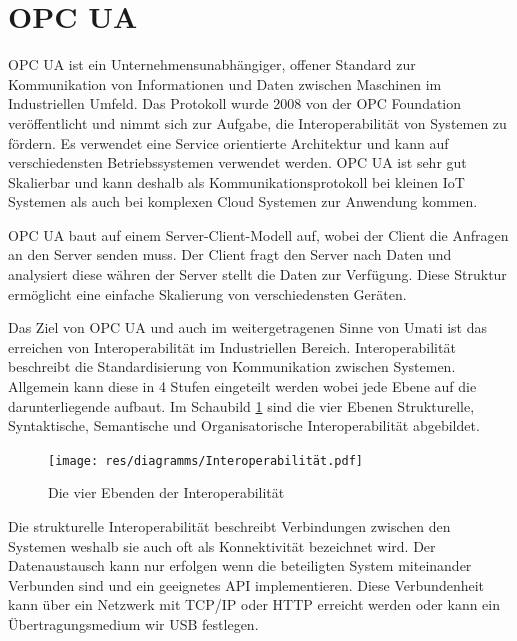 \documentclass[a4paper, 12pt, oneside]{scrbook}
\begin{document}
	
	
	\section{OPC UA}
	
	
	
	 \ac{OPC UA} ist ein Unternehmensunabhängiger, offener Standard zur Kommunikation von Informationen und Daten zwischen Maschinen im Industriellen Umfeld. Das Protokoll wurde 2008 von der OPC Foundation veröffentlicht und nimmt sich zur Aufgabe, die Interoperabilität von Systemen zu fördern. Es verwendet eine Service orientierte Architektur und kann auf verschiedensten Betriebssystemen verwendet werden. OPC UA ist sehr gut Skalierbar und kann deshalb als Kommunikationsprotokoll bei kleinen \ac{IoT} Systemen als auch bei komplexen Cloud Systemen zur Anwendung kommen.
	
	 OPC UA baut auf einem Server-Client-Modell auf, wobei der Client die Anfragen an den Server senden muss. Der Client fragt den Server nach Daten und analysiert diese währen der Server stellt die Daten zur Verfügung. Diese Struktur ermöglicht eine einfache Skalierung von verschiedensten Geräten. 
	
	
	
	 Das Ziel von OPC UA und auch im weitergetragenen Sinne von Umati ist das erreichen von Interoperabilität im Industriellen Bereich. Interoperabilität beschreibt die Standardisierung von Kommunikation zwischen Systemen. Allgemein kann diese in 4 Stufen eingeteilt werden wobei jede Ebene auf die darunterliegende aufbaut. Im Schaubild \ref{fig:Interoperabilität} sind die vier Ebenen Strukturelle, Syntaktische, Semantische und Organisatorische Interoperabilität abgebildet.
	
	\begin{figure}[h]
		\centering
		\texttt{[image: res/diagramms/Interoperabilität.pdf]}
		\caption{Die vier Ebenden der Interoperabilität}
		\label{fig:Interoperabilität}
	\end{figure}

	Die strukturelle Interoperabilität beschreibt Verbindungen zwischen den Systemen weshalb sie auch oft als Konnektivität bezeichnet wird. Der Datenaustausch kann nur erfolgen wenn die beteiligten System miteinander Verbunden sind und ein geeignetes \ac{API} implementieren. Diese Verbundenheit kann über ein Netzwerk mit TCP/IP oder HTTP erreicht werden oder kann ein Übertragungsmedium wir USB festlegen.
	
\end{document}
